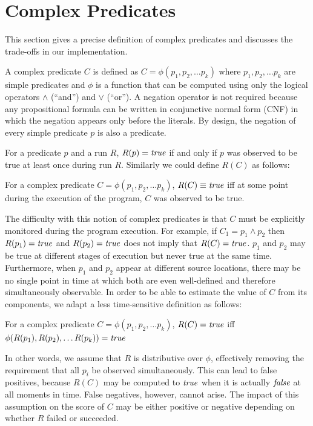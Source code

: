 
\section{Complex Predicates}
\label{sec-complex-preds}
This section gives a precise definition of complex predicates and discusses the trade-offs in our implementation.

A complex predicate $C$ is defined as $C = \phi(p_1, p_2, \ldots p_k)$ where $p_1, p_2, \ldots p_k$ are simple predicates and $\phi$ is a function that can be computed using only the logical operators $\wedge$ (``and'') and $\vee$ (``or'').  A negation operator is not required because any propositional formula can be written in conjunctive normal form (CNF) in which the negation appears only before the literals.  By design, the negation of every simple predicate $p$ is also a predicate.

For a predicate $p$ and a run $R$, $R(p) = \mathit{true}$ if and only if $p$ was observed to be true at least once during run $R$.  Similarly we could define $R(C)$ as follows:
\begin{defn}
\label{dfn1}
For a complex predicate $C = \phi(p_1, p_2, \ldots p_k)$, $R(C) \equiv \mathit{true}$ iff at some point during the execution of the program, $C$ was observed to be true.
\end{defn}

The difficulty with this notion of complex predicates is that $C$ must be explicitly monitored during the program execution.  For example, if $C_1 = p_1 \wedge p_2$ then $R(p_1) = \mathit{true}$ and $R(p_2) = \mathit{true}$ does not imply that $R(C) = \mathit{true}$.  $p_1$ and $p_2$ may be true at different stages of execution but never true at the same time.  Furthermore, when $p_1$ and $p_2$ appear at different source locations, there may be no single point in time at which both are even well-defined and therefore simultaneously observable.  In order to be able to estimate the value of $C$ from its components, we adapt a less time-sensitive definition as follows:
\begin{defn}
\label{dfn2}
For a complex predicate $C = \phi(p_1, p_2, \ldots p_k)$, $R(C) = \mathit{true}$ iff $\phi(R(p_1), R(p_2), \ldots R(p_k)) = \mathit{true}$
\end{defn}

In other words, we assume that $R$ is distributive over $\phi$, effectively removing the requirement that all $p_i$ be observed simultaneously.  This can lead to false positives, because $R(C)$ may be computed to $\mathit{true}$ when it is actually $\mathit{false}$ at all moments in time.  False negatives, however, cannot arise.  The impact of this assumption on the score of $C$ may be either positive or negative depending on whether $R$ failed or succeeded.

